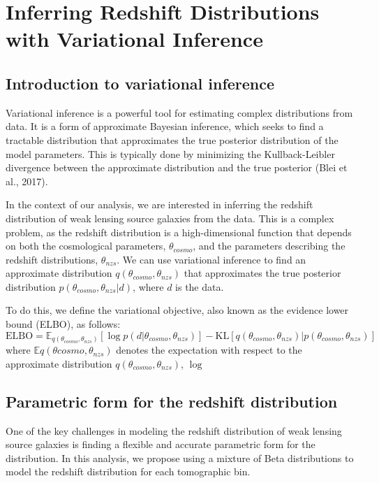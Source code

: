 \documentclass[twocolumn]{aastex631}
\begin{document}
\section{Inferring Redshift Distributions with Variational Inference}


\subsection{Introduction to variational inference}

Variational inference is a powerful tool for estimating complex distributions from data. It is a form of approximate Bayesian inference, which seeks to find a tractable distribution that approximates the true posterior distribution of the model parameters. This is typically done by minimizing the Kullback-Leibler divergence between the approximate distribution and the true posterior (Blei et al., 2017).

In the context of our analysis, we are interested in inferring the redshift distribution of weak lensing source galaxies from the data. This is a complex problem, as the redshift distribution is a high-dimensional function that depends on both the cosmological parameters, $\theta_{cosmo}$, and the parameters describing the redshift distributions, $\theta_{nzs}$. We can use variational inference to find an approximate distribution $q(\theta_{cosmo},\theta_{nzs})$ that approximates the true posterior distribution $p(\theta_{cosmo},\theta_{nzs}|d)$, where $d$ is the data.

To do this, we define the variational objective, also known as the evidence lower bound (ELBO), as follows:
\begin{equation}
\text{ELBO} = \mathbb{E}_{q(\theta_{cosmo},\theta_{nzs})} \left[ \log p(d|\theta_{cosmo},\theta_{nzs}) \right] - \text{KL}\left[ q(\theta_{cosmo},\theta_{nzs}) | p(\theta_{cosmo},\theta_{nzs})\right]
\end{equation}
where $\mathbb{E}{q(\theta{cosmo},\theta_{nzs})}$ denotes the expectation with respect to the approximate distribution $q(\theta_{cosmo},\theta_{nzs})$, $\log $

\subsection{Parametric form for the redshift distribution}

One of the key challenges in modeling the redshift distribution of weak lensing source galaxies is finding a flexible and accurate parametric form for the distribution. In this analysis, we propose using a mixture of Beta distributions to model the redshift distribution for each tomographic bin.
\end{document}
